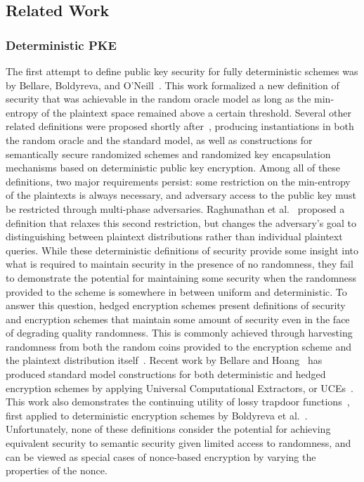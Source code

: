 \subsection{Related Work}
\label{rel_wk}

\subsubsection{Deterministic PKE}

The first attempt to define public key security for fully deterministic schemes was by Bellare, Boldyreva, and O'Neill~\cite{BBO07}.
This work formalized a new definition of security that was achievable in the random oracle model as long as the min-entropy
of the plaintext space remained above a certain threshold.  Several other related definitions were proposed shortly after~\cite{BFOR08,BSO08},
producing instantiations in both the random oracle and the standard model, as well as constructions for semantically secure randomized schemes
and randomized key encapsulation mechanisms based on deterministic public key encryption.
Among all of these definitions, two major requirements persist: some restriction on the min-entropy of the plaintexts is always necessary, and
adversary access to the public key must be restricted through multi-phase adversaries. Raghunathan et al.~\cite{RSV13} proposed
a definition that relaxes this second restriction, but changes the adversary's goal to distinguishing between plaintext distributions
rather than individual plaintext queries.  While these deterministic definitions of security provide some insight into what is
required to maintain security in the presence of no randomness, they fail to demonstrate the potential for maintaining some
security when the randomness provided to the scheme is somewhere in between uniform and deterministic.  To answer
this question, hedged encryption schemes present definitions of security and encryption schemes that maintain some
amount of security even in the face of degrading quality randomness.  This is commonly achieved through harvesting randomness
from both the random coins provided to the encryption scheme and the plaintext distribution itself~\cite{BBNRTSSHY2009}.  
Recent work by Bellare and Hoang~\cite{BH15}
has produced standard model constructions for both deterministic and hedged encryption schemes by applying Universal Computational Extractors,
or UCEs~\cite{BHK13}.  This work also demonstrates the continuing utility of lossy trapdoor functions~\cite{PW11}, first applied to deterministic encryption
schemes by Boldyreva et al.~\cite{BSO08}.  Unfortunately, none of these definitions consider the potential for achieving equivalent security to 
semantic security given limited access to randomness, and can be viewed as special cases of nonce-based encryption by varying the
properties of the nonce.

